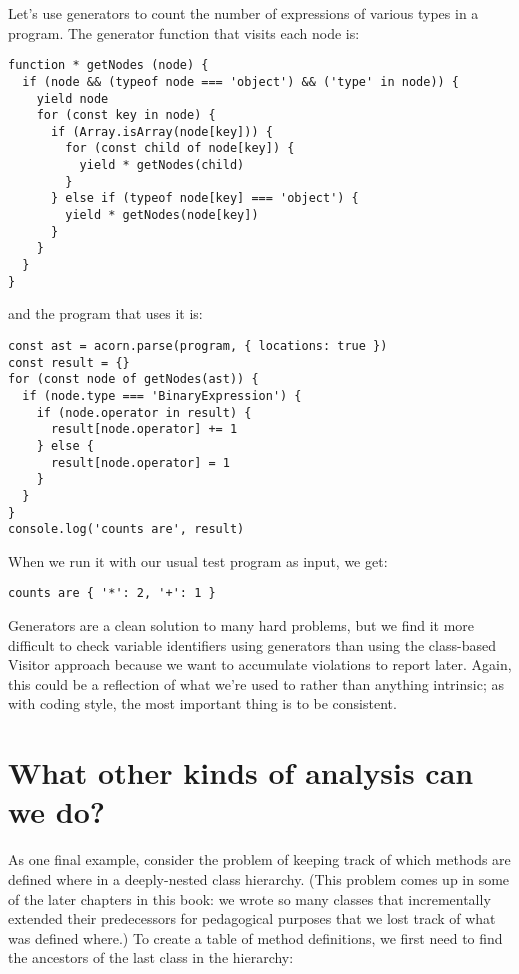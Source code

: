 \documentclass[krantzl]{krantz}
\begin{document}
Let's use generators to count the number of expressions of various types in a program.
The generator function that visits each node is:


\begin{lstlisting}[frame=single,frameround=tttt]
function * getNodes (node) {
  if (node && (typeof node === 'object') && ('type' in node)) {
    yield node
    for (const key in node) {
      if (Array.isArray(node[key])) {
        for (const child of node[key]) {
          yield * getNodes(child)
        }
      } else if (typeof node[key] === 'object') {
        yield * getNodes(node[key])
      }
    }
  }
}
\end{lstlisting}



\noindent and the program that uses it is:


\begin{lstlisting}[frame=single,frameround=tttt]
const ast = acorn.parse(program, { locations: true })
const result = {}
for (const node of getNodes(ast)) {
  if (node.type === 'BinaryExpression') {
    if (node.operator in result) {
      result[node.operator] += 1
    } else {
      result[node.operator] = 1
    }
  }
}
console.log('counts are', result)
\end{lstlisting}



When we run it with our usual test program as input, we get:


\begin{lstlisting}[frame=single,frameround=tttt]
counts are { '*': 2, '+': 1 }
\end{lstlisting}



Generators are a clean solution to many hard problems,
but we find it more difficult to check variable identifiers using generators
than using the class-based Visitor approach
because we want to accumulate violations to report later.
Again,
this could be a reflection of what we're used to rather than anything intrinsic;
as with coding style,
the most important thing is to be consistent.

\section{What other kinds of analysis can we do?}\label{style-checker-analysis}


As one final example,
consider the problem of keeping track of which methods are defined where
in a deeply-nested class hierarchy.
(This problem comes up in some of the later chapters in this book:
we wrote so many classes that incrementally extended their predecessors for pedagogical purposes
that we lost track of what was defined where.)
To create a table of method definitions,
we first need to find the ancestors of the last class in the hierarchy:
\end{document}
